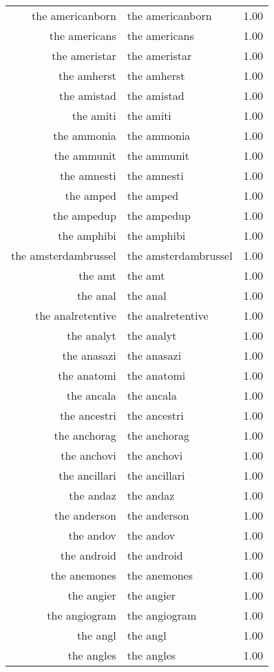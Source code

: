 \begin{table}[ht]
\begin{tabular}{rlr}
  the americanborn & the americanborn & 1.00 \\ 
  the americans & the americans & 1.00 \\ 
  the ameristar & the ameristar & 1.00 \\ 
  the amherst & the amherst & 1.00 \\ 
  the amistad & the amistad & 1.00 \\ 
  the amiti & the amiti & 1.00 \\ 
  the ammonia & the ammonia & 1.00 \\ 
  the ammunit & the ammunit & 1.00 \\ 
  the amnesti & the amnesti & 1.00 \\ 
  the amped & the amped & 1.00 \\ 
  the ampedup & the ampedup & 1.00 \\ 
  the amphibi & the amphibi & 1.00 \\ 
  the amsterdambrussel & the amsterdambrussel & 1.00 \\ 
  the amt & the amt & 1.00 \\ 
  the anal & the anal & 1.00 \\ 
  the analretentive & the analretentive & 1.00 \\ 
  the analyt & the analyt & 1.00 \\ 
  the anasazi & the anasazi & 1.00 \\ 
  the anatomi & the anatomi & 1.00 \\ 
  the ancala & the ancala & 1.00 \\ 
  the ancestri & the ancestri & 1.00 \\ 
  the anchorag & the anchorag & 1.00 \\ 
  the anchovi & the anchovi & 1.00 \\ 
  the ancillari & the ancillari & 1.00 \\ 
  the andaz & the andaz & 1.00 \\ 
  the anderson & the anderson & 1.00 \\ 
  the andov & the andov & 1.00 \\ 
  the android & the android & 1.00 \\ 
  the anemones & the anemones & 1.00 \\ 
  the angier & the angier & 1.00 \\ 
  the angiogram & the angiogram & 1.00 \\ 
  the angl & the angl & 1.00 \\ 
  the angles & the angles & 1.00 \\ 

\end{tabular}
\end{table}
